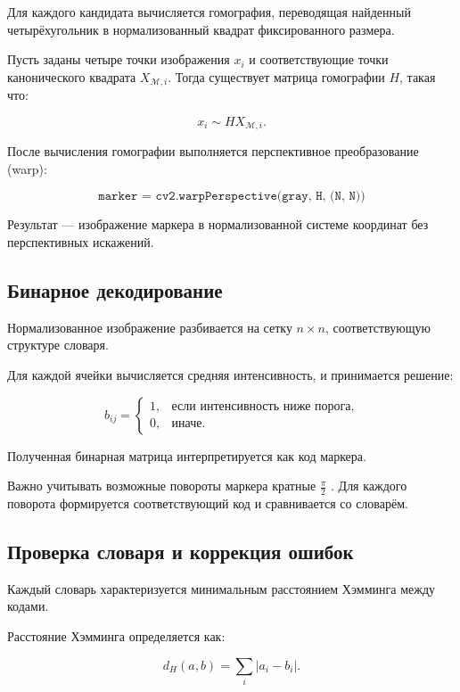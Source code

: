 \documentclass[a4paper,12pt]{article}
\begin{document}
Для каждого кандидата вычисляется гомография, переводящая найденный четырёхугольник в нормализованный квадрат фиксированного размера.

Пусть заданы четыре точки изображения $x_i$ и соответствующие точки канонического квадрата $X_{\mathcal{M},i}$. Тогда существует матрица гомографии $H$, такая что:

\begin{equation}
x_i \sim H X_{\mathcal{M},i}.
\end{equation}

После вычисления гомографии выполняется перспективное преобразование (warp):

\begin{equation*}
\texttt{marker = cv2.warpPerspective(gray, H, (N, N))}
\end{equation*}

Результат --- изображение маркера в нормализованной системе координат без перспективных искажений.

\subsection*{Бинарное декодирование}

Нормализованное изображение разбивается на сетку $n \times n$, соответствующую структуре словаря.

Для каждой ячейки вычисляется средняя интенсивность, и принимается решение:

\[
b_{ij} =
\begin{cases}
1, & \text{если интенсивность ниже порога}, \\
0, & \text{иначе}.
\end{cases}
\]

Полученная бинарная матрица интерпретируется как код маркера.

Важно учитывать возможные повороты маркера кратные $\frac{ \pi}{2}$ . Для каждого поворота формируется соответствующий код и сравнивается со словарём.

\subsection*{Проверка словаря и коррекция ошибок}

Каждый словарь характеризуется минимальным расстоянием Хэмминга между кодами.

Расстояние Хэмминга определяется как:

\begin{equation}
d_H(a,b) = \sum_{i} |a_i - b_i|.
\end{equation}
\end{document}
